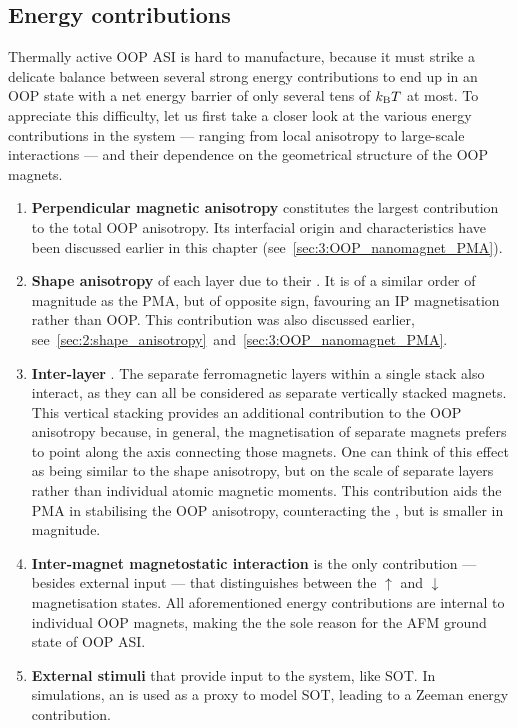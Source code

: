 \subsection{Energy contributions}\label{sec:3:E_contributions}
Thermally active OOP ASI is hard to manufacture, because it must strike a delicate balance between several strong energy contributions to end up in an OOP state with a net energy barrier of only several tens of $\kBT$ at most.
To appreciate this difficulty, let us first take a closer look at the various energy contributions in the system --- ranging from local anisotropy to large-scale interactions --- and their dependence on the geometrical structure of the OOP magnets.
\begin{enumerate}
	\item \textbf{Perpendicular magnetic anisotropy} constitutes the largest contribution to the total OOP anisotropy.
	Its interfacial origin and characteristics have been discussed earlier in this chapter (see~\cref{sec:3:OOP_nanomagnet_PMA}). %
	\item \textbf{Shape anisotropy} of each layer due to their .
	It is of a similar order of magnitude as the PMA, but of opposite sign, favouring an IP magnetisation rather than OOP.
	This contribution was also discussed earlier, see~\cref{sec:2:shape_anisotropy}~and~\ref{sec:3:OOP_nanomagnet_PMA}. %
	\item \textbf{Inter-layer }.
	The separate ferromagnetic layers within a single stack also interact, as they can all be considered as separate vertically stacked magnets.
	This vertical stacking provides an additional contribution to the OOP anisotropy because, in general, the magnetisation of separate magnets prefers to point along the axis connecting those magnets.
	One can think of this effect as being similar to the shape anisotropy, but on the scale of separate layers rather than individual atomic magnetic moments.
	This contribution aids the PMA in stabilising the OOP anisotropy, counteracting the , but is smaller in magnitude. %
	\item \textbf{Inter-magnet magnetostatic interaction} is the only contribution --- besides external input --- that distinguishes between the $\uparrow$ and $\downarrow$ magnetisation states.
	All aforementioned energy contributions are internal to individual OOP magnets, making the  the sole reason for the AFM ground state of OOP ASI. %
	\item \textbf{External stimuli} that provide input to the system, like SOT.
	In simulations, an  is used as a proxy to model SOT, leading to a Zeeman energy contribution.
\end{enumerate}
